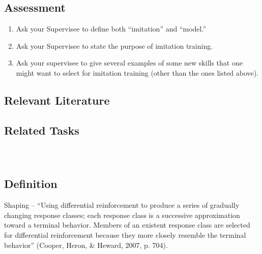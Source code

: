\subsection{Assessment}
\begin{enumerate}
\item Ask your Supervisee to define both ``imitation'' and ``model.''
\item Ask your Supervisee to state the purpose of imitation training.
\item Ask your supervisee to give several examples of some new skills that one might want to select for imitation training (other than the ones listed above).
\end{enumerate}
%
\subsection{Relevant Literature}
\begin{refsection}
\nocite{baer1967development,
    cooper2007applied,
    striefel1974transfer}
\printbibliography[heading=none]
\end{refsection}
%
\subsection{Related Tasks}
\fourdFour{}\\
%
%
%
%
%
%
%
\section{\fourdFive{}}
\subsection{Definition}
Shaping – ``Using differential reinforcement to produce a series of gradually changing response classes; each response class is a successive approximation toward a terminal behavior.  Members of an existent response class are selected for differential reinforcement because they more closely resemble the terminal behavior'' (Cooper, Heron, \& Heward, 2007, p. 704).
% 

